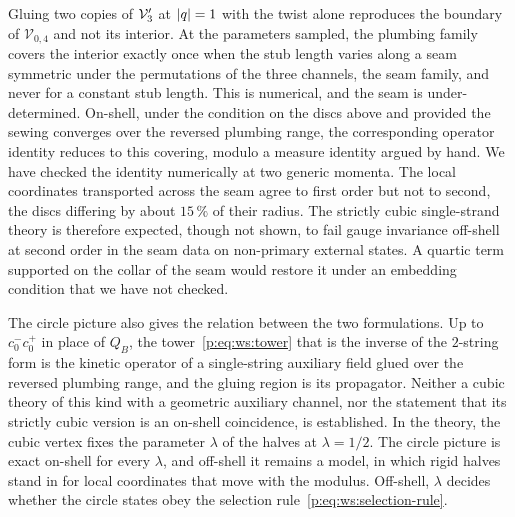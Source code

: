 Gluing two copies of $\mathcal{V}_{3}'$ at ${|q|} = 1$ with the twist alone reproduces the boundary of $\mathcal V_{0,4}$ and not its interior.
At the parameters sampled, the plumbing family covers the interior exactly once when the stub length varies along a seam symmetric under the permutations of the three channels, the seam family, and never for a constant stub length.
This is numerical, and the seam is under-determined.
On-shell, under the condition on the discs above and provided the sewing converges over the reversed plumbing range, the corresponding operator identity reduces to this covering, modulo a measure identity argued by hand.
We have checked the identity numerically at two generic momenta.
The local coordinates transported across the seam agree to first order but not to second, the discs differing by about $15 \, \%$ of their radius.
The strictly cubic single-strand theory is therefore expected, though not shown, to fail gauge invariance off-shell at second order in the seam data on non-primary external states.
A quartic term supported on the collar of the seam would restore it under an embedding condition that we have not checked.

The circle picture also gives the relation between the two formulations.
Up to $c_0^- c_0^+$ in place of $Q_B$, the tower~\eqref{p:eq:ws:tower} that is the inverse of the $2$-string form is the kinetic operator of a single-string auxiliary field glued over the reversed plumbing range, and the gluing region is its propagator.
Neither a cubic theory of this kind with a geometric auxiliary channel, nor the statement that its strictly cubic version is an on-shell coincidence, is established.
In the theory, the cubic vertex fixes the parameter $\lambda$ of the halves at $\lambda = 1 / 2$.
The circle picture is exact on-shell for every $\lambda$, and off-shell it remains a model, in which rigid halves stand in for local coordinates that move with the modulus.
Off-shell, $\lambda$ decides whether the circle states obey the selection rule~\eqref{p:eq:ws:selection-rule}.

